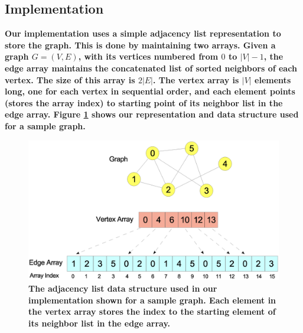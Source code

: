 \subsection{Implementation}
\label{subsec:implementation}

{\bf Our implementation uses a simple adjacency list representation to store the graph. This is done by maintaining two arrays. Given a graph $G=(V,E)$, with its vertices numbered from $0$ to $|V|-1$, the edge array maintains the concatenated list of sorted neighbors of each vertex. The size of this array is $2|E|$. The vertex array is $|V|$ elements long, one for each vertex in sequential order, and each element points (stores the array index) to starting point of its neighbor list in the edge array. 
Figure \ref{fig-implementation} shows our representation and data structure used for a sample graph.}

\begin{figure}
  \centering
    \includegraphics[scale=0.25]{implementation.eps}
\caption{{\bf The adjacency list data structure used in our implementation shown for a sample graph. Each element in the vertex array stores the index to the starting element of its neighbor list in the edge array.}}
\label{fig-implementation}
\end{figure}

